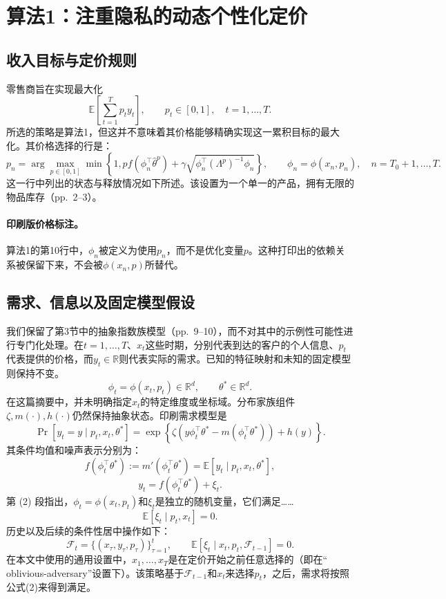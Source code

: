 \documentclass{article}
\begin{document}
\section*{算法1：注重隐私的动态个性化定价}

\subsection*{收入目标与定价规则}
零售商旨在实现最大化
\[
\mathbb E\!\left[\sum_{t=1}^{T}p_ty_t\right],
\qquad p_t\in[0,1],\quad t=1,\ldots,T.
\]
所选的策略是算法1，但这并不意味着其价格能够精确实现这一累积目标的最大化。其价格选择的行是：
\[
p_n=\arg\max_{p\in[0,1]}\min\left\{1,
 p f\!\left(\phi_n^{\top}\widehat\theta^{p}\right)
 +\gamma\sqrt{\phi_n^{\top}(\Lambda^{p})^{-1}\phi_n}\right\},
\qquad \phi_n=\phi(x_n,p_n),
\quad n=T_0+1,\ldots,T.
\]
这一行中列出的状态与释放情况如下所述。该设置为一个单一的产品，拥有无限的物品库存（pp.~2--3）。

\paragraph{印刷版价格标注。}
算法1的第10行中，$\phi_n$被定义为使用$p_n$，而不是优化变量$p$。这种打印出的依赖关系被保留下来，不会被$\phi(x_n,p)$所替代。

\subsection*{需求、信息以及固定模型假设}
我们保留了第3节中的抽象指数族模型（pp.~9--10），而不对其中的示例性可能性进行专门化处理。在$t=1,\ldots,T$、$x_t$这些时期，分别代表到达的客户的个人信息、$p_t$代表提供的价格，而$y_t\in\mathbb R$则代表实际的需求。已知的特征映射和未知的固定模型则保持不变。
\[
\phi_t=\phi(x_t,p_t)\in\mathbb R^d,
\qquad \theta^*\in\mathbb R^d.
\]
在这篇摘要中，并未明确指定$x_t$的特定维度或坐标域。分布家族组件$\zeta,m(\cdot),h(\cdot)$仍然保持抽象状态。印刷需求模型是
\begin{equation}
\Pr[y_t=y\mid p_t,x_t,\theta^*]
=\exp\!\left\{\zeta\left(y\phi_t^{\top}\theta^*
-m(\phi_t^{\top}\theta^*)\right)+h(y)\right\}.
\tag{1}
\end{equation}
其条件均值和噪声表示分别为：
\[
f(\phi_t^{\top}\theta^*):=m'(\phi_t^{\top}\theta^*)
=\mathbb E[y_t\mid p_t,x_t,\theta^*],
\]
\begin{equation}
y_t=f(\phi_t^{\top}\theta^*)+\xi_t.
\tag{2}
\end{equation}
第 (2) 段指出，$\phi_t=\phi(x_t,p_t)$和$\xi_t$是独立的随机变量，它们满足……
\[
\mathbb E[\xi_t\mid p_t,x_t]=0.
\]
历史以及后续的条件性居中操作如下：
\[
\mathcal F_t=\{(x_\tau,y_\tau,p_\tau)\}_{\tau=1}^{t},
\qquad
\mathbb E[\xi_t\mid x_t,p_t,\mathcal F_{t-1}]=0.
\]
在本文中使用的通用设置中，$x_1,\ldots,x_T$是在定价开始之前任意选择的（即在“ oblivious-adversary”设置下）。该策略基于$\mathcal F_{t-1}$和$x_t$来选择$p_t$，之后，需求将按照公式(2)来得到满足。
\end{document}
